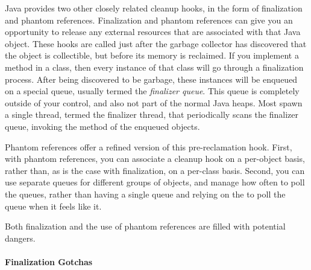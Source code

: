 Java provides two other closely related cleanup hooks, in the form of
finalization and phantom references. Finalization and phantom references can
give you an opportunity to release any external resources that are associated
with that Java object. These hooks are called just after the garbage collector
has discovered that the object is collectible, but before its memory is
reclaimed. If you implement a  method in a class, then every
instance of that class will go through a finalization process. After being
discovered to be garbage, these instances will be enqueued on a special queue,
usually termed the \emph{finalizer queue}. This queue is completely outside of
your control, and also not part of the normal Java heaps. Most \jres spawn a
single thread, termed the finalizer thread, that periodically scans the
finalizer queue, invoking the  method of the enqueued objects.

Phantom references offer a refined version of this pre-reclamation hook. First,
with phantom references, you can associate a cleanup hook on a per-object basis,
rather than, as is the case with finalization, on a per-class basis. Second, you
can use separate queues for different groups of objects, and manage how often to
poll the queues, rather than having a single queue and relying on the \jre to
poll the queue when it feels like it.


Both finalization and the use of phantom references are filled with potential
dangers.



\paragraph{Finalization Gotchas}

